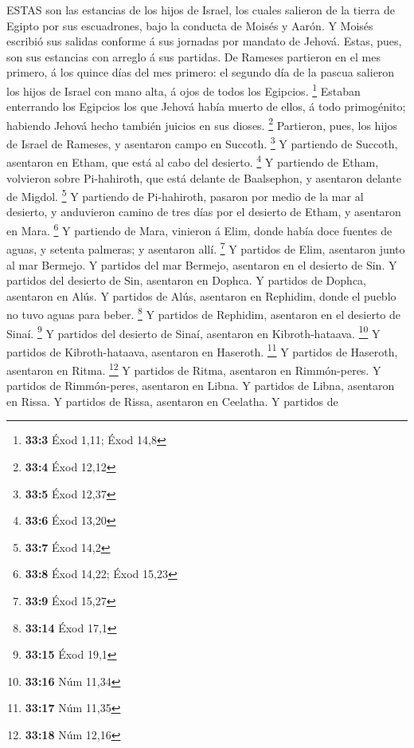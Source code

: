  ESTAS son las estancias de los hijos de Israel, los cuales
salieron de la tierra de Egipto por sus escuadrones, bajo la conducta de
Moisés y Aarón.  Y Moisés escribió sus salidas conforme á
sus jornadas por mandato de Jehová. Estas, pues, son sus estancias con
arreglo á sus partidas.  De Rameses partieron en el mes
primero, á los quince días del mes primero: el segundo día de la pascua
salieron los hijos de Israel con mano alta, á ojos de todos los
Egipcios. \footnote{\textbf{33:3} Éxod 1,11; Éxod 14,8} 
Estaban enterrando los Egipcios los que Jehová había muerto de ellos, á
todo primogénito; habiendo Jehová hecho también juicios en sus dioses.
\footnote{\textbf{33:4} Éxod 12,12}  Partieron, pues, los
hijos de Israel de Rameses, y asentaron campo en Succoth. \footnote{\textbf{33:5}
  Éxod 12,37}  Y partiendo de Succoth, asentaron en Etham,
que está al cabo del desierto. \footnote{\textbf{33:6} Éxod 13,20}
 Y partiendo de Etham, volvieron sobre Pi-hahiroth, que está
delante de Baalsephon, y asentaron delante de Migdol. \footnote{\textbf{33:7}
  Éxod 14,2}  Y partiendo de Pi-hahiroth, pasaron por medio
de la mar al desierto, y anduvieron camino de tres días por el desierto
de Etham, y asentaron en Mara. \footnote{\textbf{33:8} Éxod 14,22; Éxod
  15,23}  Y partiendo de Mara, vinieron á Elim, donde había
doce fuentes de aguas, y setenta palmeras; y asentaron allí. \footnote{\textbf{33:9}
  Éxod 15,27}  Y partidos de Elim, asentaron junto al mar
Bermejo.  Y partidos del mar Bermejo, asentaron en el
desierto de Sin.  Y partidos del desierto de Sin, asentaron
en Dophca.  Y partidos de Dophca, asentaron en Alús.
 Y partidos de Alús, asentaron en Rephidim, donde el pueblo
no tuvo aguas para beber. \footnote{\textbf{33:14} Éxod 17,1}
 Y partidos de Rephidim, asentaron en el desierto de Sinaí.
\footnote{\textbf{33:15} Éxod 19,1}  Y partidos del
desierto de Sinaí, asentaron en Kibroth-hataava. \footnote{\textbf{33:16}
  Núm 11,34}  Y partidos de Kibroth-hataava, asentaron en
Haseroth. \footnote{\textbf{33:17} Núm 11,35}  Y partidos
de Haseroth, asentaron en Ritma. \footnote{\textbf{33:18} Núm 12,16}
 Y partidos de Ritma, asentaron en Rimmón-peres.
 Y partidos de Rimmón-peres, asentaron en Libna.
 Y partidos de Libna, asentaron en Rissa.  Y
partidos de Rissa, asentaron en Ceelatha.  Y partidos de
